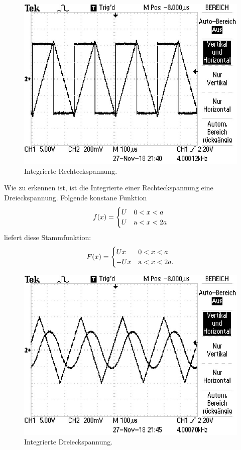 \begin{figure}[H]
  \centering
  \includegraphics{Rechteck.JPG}
  \caption{Integrierte Rechteckspannung.}
  \label{fig:plot}
\end{figure}
\noindent Wie zu erkennen ist, ist die Integrierte einer Rechteckspannung eine Dreieckspannung.
Folgende konstane Funktion
\begin{equation*}
  f(x) =
  \begin{cases}
    U & \text 0 < x < a \\
    U & \text a < x < 2a \\
  \end{cases}
\end{equation*}
liefert diese Stammfunktion:
\begin{equation*}
  F(x) =
  \begin{cases}
    Ux & \text 0 < x < a \\
    -Ux & \text a < x < 2a .\\
  \end{cases}
\end{equation*}

\begin{figure}[H]
  \centering
  \includegraphics{Dreieck.JPG}
  \caption{Integrierte Dreieckspannung.}
  \label{fig:plot}
\end{figure}

